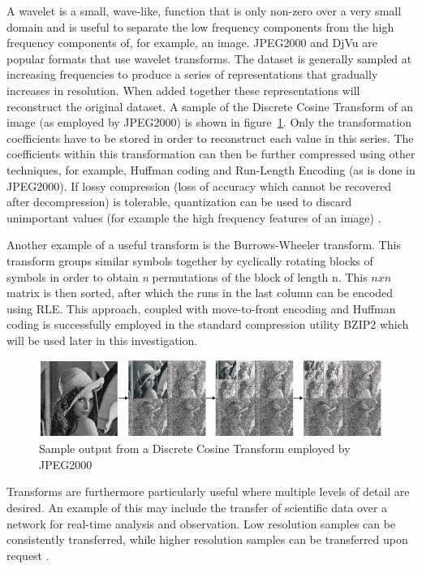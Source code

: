 A wavelet is a small, wave-like, function that is only non-zero over a very small domain and is useful to separate the low frequency components from the high frequency components of, 
for example, an image. JPEG2000 and DjVu are popular formats that use wavelet transforms. The dataset is generally sampled at increasing frequencies to produce a series of representations 
that gradually increases in resolution. When added together these representations will reconstruct the original dataset. A sample of the Discrete Cosine Transform of an image (as employed by JPEG2000) 
is shown in figure~\ref{TRANSFORM_SAMPLE}. Only the transformation coefficients have to be stored in order to reconstruct each value in this series. The coefficients within this transformation 
can then be further compressed using other techniques, for example, Huffman coding and Run-Length Encoding (as is done in JPEG2000). If lossy compression (loss of accuracy which cannot be recovered after 
decompression) is tolerable, quantization can be used to discard unimportant values (for example the high frequency features of an image) \cite{952804}\cite[ch. 5]{salomon2004data}.

Another example of a useful transform is the Burrows-Wheeler transform. This transform groups similar symbols together by cyclically rotating blocks of symbols in order to 
obtain \textit{n} permutations of the block of length n. This $nxn$ matrix is then sorted, after which the runs in the last column can be encoded using RLE. This approach, coupled
with move-to-front encoding and Huffman coding is successfully employed in the standard compression utility BZIP2 which will be used later in this investigation\cite[ch. 8]{salomon2004data}\cite{seward1996bzip2}.
\begin{figure}[h!]
\begin{mdframed}
 \centering
 \includegraphics[width=1.0\textwidth]{DCTSample.png}
 \caption{Sample output from a Discrete Cosine Transform employed by JPEG2000 \cite{952804}}
 \label{TRANSFORM_SAMPLE}
\end{mdframed}
\end{figure}

Transforms are furthermore particularly useful where multiple levels of detail are desired. An example of this may include the transfer of scientific data over a network 
for real-time analysis and observation. Low resolution samples can be consistently transferred, while higher resolution samples can be transferred upon request \cite{Tao:1994:PTS:951087.951108}.
